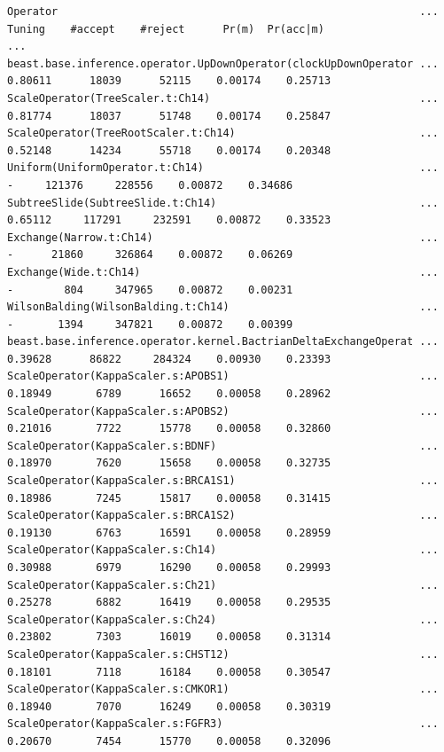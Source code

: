 \documentclass[12pt]{article}
\begin{document}
\begin{verbatim}Operator                                                         ...  Tuning    #accept    #reject      Pr(m)  Pr(acc|m)
...
beast.base.inference.operator.UpDownOperator(clockUpDownOperator ... 0.80611      18039      52115    0.00174    0.25713 
ScaleOperator(TreeScaler.t:Ch14)                                 ... 0.81774      18037      51748    0.00174    0.25847 
ScaleOperator(TreeRootScaler.t:Ch14)                             ... 0.52148      14234      55718    0.00174    0.20348 
Uniform(UniformOperator.t:Ch14)                                  ...       -     121376     228556    0.00872    0.34686 
SubtreeSlide(SubtreeSlide.t:Ch14)                                ... 0.65112     117291     232591    0.00872    0.33523 
Exchange(Narrow.t:Ch14)                                          ...       -      21860     326864    0.00872    0.06269 
Exchange(Wide.t:Ch14)                                            ...       -        804     347965    0.00872    0.00231 
WilsonBalding(WilsonBalding.t:Ch14)                              ...       -       1394     347821    0.00872    0.00399 
beast.base.inference.operator.kernel.BactrianDeltaExchangeOperat ... 0.39628      86822     284324    0.00930    0.23393 
ScaleOperator(KappaScaler.s:APOBS1)                              ... 0.18949       6789      16652    0.00058    0.28962 
ScaleOperator(KappaScaler.s:APOBS2)                              ... 0.21016       7722      15778    0.00058    0.32860 
ScaleOperator(KappaScaler.s:BDNF)                                ... 0.18970       7620      15658    0.00058    0.32735 
ScaleOperator(KappaScaler.s:BRCA1S1)                             ... 0.18986       7245      15817    0.00058    0.31415 
ScaleOperator(KappaScaler.s:BRCA1S2)                             ... 0.19130       6763      16591    0.00058    0.28959 
ScaleOperator(KappaScaler.s:Ch14)                                ... 0.30988       6979      16290    0.00058    0.29993 
ScaleOperator(KappaScaler.s:Ch21)                                ... 0.25278       6882      16419    0.00058    0.29535 
ScaleOperator(KappaScaler.s:Ch24)                                ... 0.23802       7303      16019    0.00058    0.31314 
ScaleOperator(KappaScaler.s:CHST12)                              ... 0.18101       7118      16184    0.00058    0.30547 
ScaleOperator(KappaScaler.s:CMKOR1)                              ... 0.18940       7070      16249    0.00058    0.30319 
ScaleOperator(KappaScaler.s:FGFR3)                               ... 0.20670       7454      15770    0.00058    0.32096 

\end{verbatim}
\end{document}

